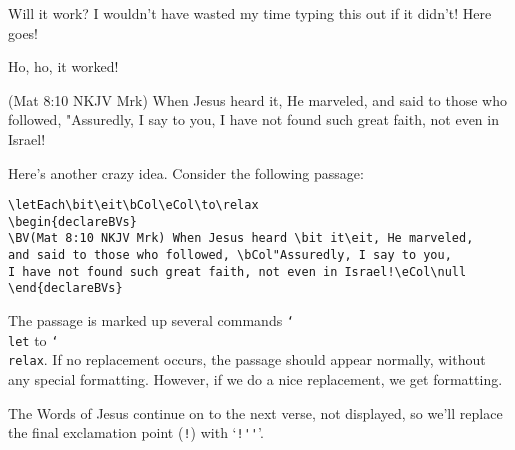 \documentclass{article}
\providecommand\cs[1]{\texttt{\char`\\#1}}
\begin{document}
Will it work? I wouldn't have wasted my time typing this out
if it didn't! Here goes!
\begin{fpquote}[rightmargin=0pt]
\end{fpquote}
Ho, ho, it worked!

\bit\eit\bCol\eCol\to\relax
\begin{declareBVs}
\BV(Mat 8:10 NKJV Mrk) When Jesus heard \bit it\eit, %
He marveled, and said to those who followed, \bCol"Assuredly, %
I say to you, I have not found such great faith, not even in %
Israel!\eCol\null
\end{declareBVs}

\medskip\noindent
Here's another crazy idea. Consider the following passage:
\begin{verbatim}
\letEach\bit\eit\bCol\eCol\to\relax
\begin{declareBVs}
\BV(Mat 8:10 NKJV Mrk) When Jesus heard \bit it\eit, He marveled,
and said to those who followed, \bCol"Assuredly, I say to you,
I have not found such great faith, not even in Israel!\eCol\null
\end{declareBVs}
\end{verbatim}
The passage is marked up several commands \cs{let} to \cs{relax}. If no replacement occurs, the passage should
appear normally, without any special formatting. However, if we do a nice replacement, we get formatting.
\begin{quote}
\bDQ
\end{quote}
The Words of Jesus continue on to the next verse, not displayed, so we'll replace the final exclamation
point (\texttt{!}) with `\verb|!''|'.
\end{document}
